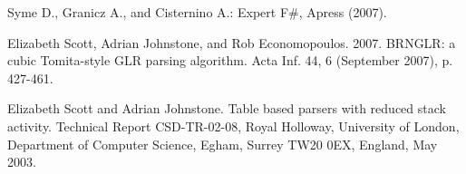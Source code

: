 \documentclass{sigplanconf}
\begin{document}
\begin{thebibliography}{}
Syme D., Granicz A., and Cisternino A.: Expert F\#, Apress (2007).

Elizabeth Scott, Adrian Johnstone, and Rob Economopoulos. 2007. BRNGLR: a cubic Tomita-style GLR parsing algorithm. Acta Inf. 44, 6 (September 2007), p. 427-461.

Elizabeth Scott and Adrian Johnstone. Table based parsers with reduced stack activity. Technical Report CSD-TR-02-08, Royal Holloway, University of London, Department of Computer Science, Egham, Surrey TW20 0EX, England, May 2003.


\end{thebibliography}
\end{document}
